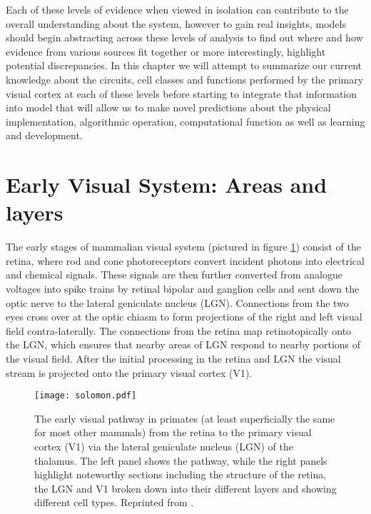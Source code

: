 Each of these levels of evidence when viewed in isolation can
contribute to the overall understanding about the system, however to
gain real insights, models should begin abstracting across these
levels of analysis to find out where and how evidence from various
sources fit together or more interestingly, highlight potential
discrepancies. In this chapter we will attempt to summarize our
current knowledge about the circuits, cell classes and functions
performed by the primary visual cortex at each of these levels before
starting to integrate that information into model that will allow us
to make novel predictions about the physical implementation,
algorithmic operation, computational function as well as learning and
development.

\section{Early Visual System: Areas and layers}

The early stages of mammalian visual system (pictured in figure
\ref{VisualSystem}) consist of the retina, where rod and cone
photoreceptors convert incident photons into electrical and chemical
signals. These signals are then further converted from analogue
voltages into spike trains by retinal bipolar and ganglion cells and
sent down the optic nerve to the lateral geniculate nucleus
(LGN). Connections from the two eyes cross over at the optic chiasm to
form projections of the right and left visual field
contra-laterally. The connections from the retina map retinotopically
onto the LGN, which ensures that nearby areas of LGN respond to nearby
portions of the visual field. After the initial processing in the
retina and LGN the visual stream is projected onto the primary visual
cortex (V1).

\begin{figure}
	\centering
        \texttt{[image: solomon.pdf]}
	\caption{The early visual pathway in primates (at least
          superficially the same for most other mammals) from the
          retina to the primary visual cortex (V1) via the lateral
          geniculate nucleus (LGN) of the thalamus. The left panel
          shows the pathway, while the right panels highlight
          noteworthy sections including the structure of the retina,
          the LGN and V1 broken down into their different layers and
          showing different cell types. Reprinted from
          \cite{Solomon2007}.}
	\label{VisualSystem}
\end{figure}

